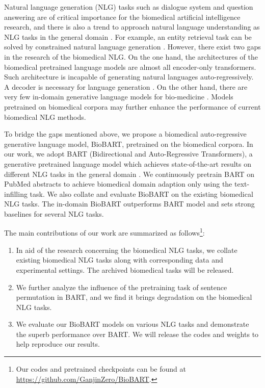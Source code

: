 \documentclass[11pt]{article}
\begin{document}
Natural language generation (NLG) tasks such as dialogue system \cite{chao2017building} and question answering \cite{qasurvey} are of critical importance for the biomedical artificial intelligence research, and there is also a trend to approach natural language understanding as NLG tasks in the general domain \cite{sun2021paradigm,bartner}. For example, an entity retrieval task can be solved by constrained natural language generation \cite{GENRE}.
However, there exist two gaps in the research of the biomedical NLG. On the one hand, the architectures of the biomedical pretrained language models are almost all encoder-only transformers. Such architecture is incapable of generating natural languages auto-regressively. 
A decoder is necessary for language generation \cite{bertsumext}. 
On the other hand, there are very few in-domain generative language models for bio-medicine \cite{Phan2021SciFiveAT}. Models pretrained on biomedical corpora may further enhance the performance of current biomedical NLG methods.


To bridge the gaps mentioned above, we propose a biomedical auto-regressive generative language model, BioBART, pretrained on the biomedical corpora. 
In our work, we adopt BART (Bidirectional and Auto-Regressive Transformers), a generative pretrained language model which achieves state-of-the-art results on different NLG tasks in the general domain \cite{BART}. We continuously pretrain BART on PubMed abstracts to achieve biomedical domain adaption only using the text-infilling task. We also collate and evaluate BioBART on the existing biomedical NLG tasks. The in-domain BioBART outperforms BART model and sets strong baselines for several NLG tasks.


The main contributions of our work are summarized as follows\footnote{Our codes and pretrained checkpoints can be found at \url{https://github.com/GanjinZero/BioBART}.}:
\begin{enumerate}
    \item In aid of the research concerning the biomedical NLG tasks, we collate existing biomedical NLG tasks along with corresponding data and experimental settings. 
    The archived biomedical tasks will be released.
    
    \item We further analyze the influence of the pretraining task of sentence permutation in BART, and we find it brings degradation on the biomedical NLG tasks.
    
    \item 
    We evaluate our BioBART models on various NLG tasks and demonstrate the superb performance over BART.
    We will release the codes and weights to help reproduce our results.  
    
\end{enumerate}
\end{document}
